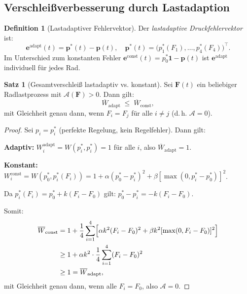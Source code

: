 ﻿\documentclass[a4paper,12pt]{article}
\theoremstyle{definition}
\newtheorem{definition}{Definition}
\newtheorem{satz}{Satz}
\begin{document}
\subsection{Verschleißverbesserung durch Lastadaption}

\begin{definition}[Lastadaptiver Fehlervektor]
Der \emph{lastadaptive Druckfehlervektor} ist:
\[
    \mathbf{e}^{\text{adapt}}(t) = \mathbf{p}^*(t) - \mathbf{p}(t),
    \quad \mathbf{p}^*(t) = \bigl(p^*_1(F_1),\ldots, p^*_4(F_4)\bigr)^{\top}.
\]
Im Unterschied zum konstanten Fehler $\mathbf{e}^{\text{const}}(t) = p^*_0\mathbf{1} - \mathbf{p}(t)$
ist $\mathbf{e}^{\text{adapt}}$ individuell für jedes Rad.
\end{definition}

\begin{satz}[Gesamtverschleiß lastadaptiv vs. konstant]
\label{satz:asymm_versch}
Sei $\mathbf{F}(t)$ ein beliebiger Radlastprozess mit $\mathcal{A}(\mathbf{F}) > 0$.
Dann gilt:
\[
    \overline{W}_{\text{adapt}} \;\leq\; \overline{W}_{\text{const}},
\]
mit Gleichheit genau dann, wenn $F_i = F_j$ für alle $i \neq j$ (d.\,h. $\mathcal{A} = 0$).
\end{satz}

\begin{proof}
Sei $p_i = p^*_i$ (perfekte Regelung, kein Regelfehler). Dann gilt:

\textbf{Adaptiv:}
$W_i^{\text{adapt}} = W(p^*_i, p^*_i) = 1$ für alle $i$, also
$\overline{W}_{\text{adapt}} = 1$.

\textbf{Konstant:}
$W_i^{\text{const}} = W(p^*_0, p^*_i(F_i))
= 1 + \alpha(p^*_0 - p^*_i)^2 + \beta[\max(0, p^*_i - p^*_0)]^2$.

Da $p^*_i(F_i) = p^*_0 + k(F_i - F_0)$ gilt:
$p^*_0 - p^*_i = -k(F_i - F_0)$.

Somit:
\begin{align*}
    \overline{W}_{\text{const}} &= 1 + \frac{1}{4}\sum_{i=1}^{4}
    \Bigl[\alpha k^2(F_i - F_0)^2 + \beta k^2 [\max(0, F_i - F_0)]^2\Bigr]\\
    &\geq 1 + \alpha k^2 \cdot \frac{1}{4}\sum_{i=1}^{4}(F_i - F_0)^2\\
    &\geq 1 = \overline{W}_{\text{adapt}},
\end{align*}
mit Gleichheit genau dann, wenn alle $F_i = F_0$, also $\mathcal{A} = 0$.
\end{proof}
\end{document}
